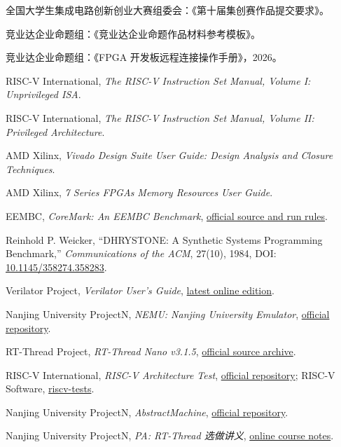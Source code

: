 \small
\begin{enumerate}[label={\textup{[\arabic*]}},leftmargin=3em,itemsep=0.08em,topsep=0.2em]
  \item 全国大学生集成电路创新创业大赛组委会：《第十届集创赛作品提交要求》。
  \item 竞业达企业命题组：《竞业达企业命题作品材料参考模板》。
  \item 竞业达企业命题组：《FPGA 开发板远程连接操作手册》，2026。
  \item RISC-V International, \emph{The RISC-V Instruction Set Manual, Volume I: Unprivileged ISA}.
  \item RISC-V International, \emph{The RISC-V Instruction Set Manual, Volume II: Privileged Architecture}.
  \item AMD Xilinx, \emph{Vivado Design Suite User Guide: Design Analysis and Closure Techniques}.
  \item AMD Xilinx, \emph{7 Series FPGAs Memory Resources User Guide}.
  \item EEMBC, \emph{CoreMark: An EEMBC Benchmark},
  \href{https://github.com/eembc/coremark}{official source and run rules}.
  \item Reinhold P. Weicker, ``DHRYSTONE: A Synthetic Systems Programming Benchmark,''
  \emph{Communications of the ACM}, 27(10), 1984,
  DOI: \href{https://doi.org/10.1145/358274.358283}{10.1145/358274.358283}.
  \item Verilator Project, \emph{Verilator User's Guide},
  \href{https://verilator.org/guide/latest/}{latest online edition}.
  \item Nanjing University ProjectN, \emph{NEMU: Nanjing University Emulator},
  \href{https://github.com/NJU-ProjectN/nemu}{official repository}.
  \item RT-Thread Project, \emph{RT-Thread Nano v3.1.5},
  \href{https://github.com/RT-Thread/rtthread-nano/tree/v3.1.5}{official source archive}.
  \item RISC-V International, \emph{RISC-V Architecture Test},
  \href{https://github.com/riscv-non-isa/riscv-arch-test}{official repository}; RISC-V Software,
  \href{https://github.com/riscv-software-src/riscv-tests}{riscv-tests}.
  \item Nanjing University ProjectN, \emph{AbstractMachine},
  \href{https://github.com/NJU-ProjectN/abstract-machine}{official repository}.
  \item Nanjing University ProjectN, \emph{PA: RT-Thread 选做讲义},
  \href{https://ysyx.oscc.cc/docs/ics-pa/4.1.html\#rt-thread-\%E9\%80\%89\%E5\%81\%9A}{online course notes}.

\end{enumerate}
